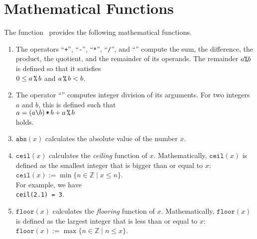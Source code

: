 \section{Mathematical Functions}
The function \setlx\ provides the following mathematical functions.
\begin{enumerate}
\item The operators 
      ``\texttt{+}'',
      ``\texttt{-}'',
      ``\texttt{*}'',
      ``\texttt{/}'', and
      ``\texttt{}'' compute the sum, the difference, the product, the quotient,
      and the remainder of its operands.  The remainder $a \texttt{\symbol{37}} b$ is
      defined so that it satisfies
      \\[0.2cm]
      \hspace*{1.3cm}
      $0 \leq a \,\texttt{\symbol{37}}\, b$ \quad and \quad $a \,\texttt{\symbol{37}}\, b < b$.
\item The operator ``\texttt{}'' computes integer division of its arguments.
      For two integers $a$ and $b$, this is defined such that 
      \\[0.2cm]
      \hspace*{1.3cm}
      $a = (a\texttt{\symbol{92}} b) \,\texttt{*}\, b + a \,\texttt{\symbol{37}}\, b$
      \\[0.2cm]
      holds.
\item $\texttt{abs}(x)$ calculates the absolute value of the number $x$.
\item $\texttt{ceil}(x)$ calculates the \emph{ceiling} function of $x$.  Mathematically,
      $\mathtt{ceil}(x)$ is defined as the smallest integer that is bigger than or equal
      to $x$:
      \\[0.2cm]
      \hspace*{1.3cm}
      $\texttt{ceil}(x) := \min \{ n \in \mathbb{Z} \mid x \leq n \}$.
      \\[0.2cm]
      For example, we have
      \\[0.2cm]
      \hspace*{1.3cm}
      \texttt{ceil(2.1) = 3}.
\item $\texttt{floor}(x)$ calculates the \emph{flooring} function of $x$.  Mathematically,
      $\mathtt{floor}(x)$ is defined as the largest integer that is less than or equal
      to $x$:
      \\[0.2cm]
      \hspace*{1.3cm}
      $\texttt{floor}(x) := \max \{ n \in \mathbb{Z} \mid n \leq x \}$.
      \\[0.2cm]

\end{enumerate}

